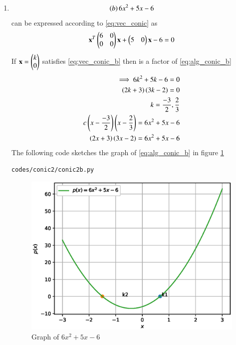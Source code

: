 \begin{enumerate}[label=\thesection.\arabic*.,ref=\thesection.\theenumi]
\item 
\begin{align}
\label{eq:alg_conic_b}
\left(b\right) 6x^{2} + 5x -6
\end{align}
can be expressed according to \ref{eq:vec_conic} as 
\begin{align}
\label{eq:vec_conic_b}
\mathbf{x}^T \begin{pmatrix}6 & 0\\0 & 0\end{pmatrix}\mathbf{x}+ \begin{pmatrix}5 & 0\end{pmatrix}\mathbf{x} -6 =0
\end{align}
If $\mathbf{x}=\begin{pmatrix}k\\0\end{pmatrix}$ satisfies \ref{eq:vec_conic_b} then  is a factor of \ref{eq:alg_conic_b}
\begin{align}
\implies 
6k^{2}+5k-6=0
\\
\left(2k+3\right)\left(3k-2\right)=0
\\
k=\frac{-3}{2}, \frac{2}{3}
\\
c\left(x-\frac{-3}{2}\right)\left(x-\frac{2}{3}\right)= 6x^{2} + 5x -6
\\
\left(2x+3\right)\left(3x-2\right)= 6x^{2} + 5x -6
\end{align}
The following code sketches the graph of \ref{eq:alg_conic_b} in figure \ref{fig:conic2b}
\begin{lstlisting}
codes/conic2/conic2b.py
\end{lstlisting}
\begin{figure}[!ht]
\centering
\includegraphics[width=\columnwidth]{./codes/conic2/pyfigs/conic2b.eps}
\caption{Graph of $6x^{2} + 5x -6$}
\label{fig:conic2b}
\end{figure}


\end{enumerate}
